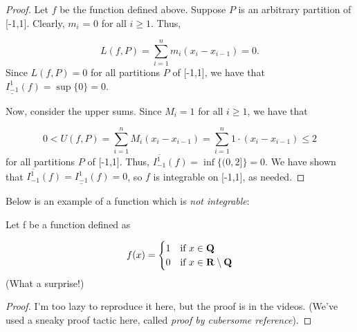 \documentclass{article}
\begin{document}
  \begin{proof}
    Let \(f\) be the function defined above. Suppose \(P\) is an arbitrary partition of [-1,1]. Clearly, \(m_i\) = 0 for all \(i \geq 1\). Thus,

    \[
      L(f,P) = \sum_{i = 1}^{n}{m_i(x_i - x_{i-1})} = 0.
    \]
    Since \(L(f,P) = 0\) for all partitions \(P\) of [-1,1], we have that \(\underline{I_{-1}^{1}}(f) = \sup\{0\} = 0\).

    Now, consider the upper sums. Since \(M_i = 1\) for all \(i \geq 1\), we have that

    \[
      0 < U(f,P) = \sum_{i = 1}^{n}{M_i(x_i - x_{i-1})} = \sum_{i = 1}^{n}{1 \cdot (x_i - x_{i-1})} \leq 2
    \]
    for all partitions \(P\) of [-1,1]. Thus, \(\overline{I_{-1}^{1}}(f) = \inf\{(0,2]\} = 0\).
    \vspace*{5pt}
    We have shown that \(\overline{I_{-1}^{1}}(f) = \underline{I_{-1}^{1}}(f) = 0\), so \(f\) is integrable on [-1,1], as needed.
  \end{proof}

  Below is an example of a function which is \emph{not integrable}:

  \begin{eg}
    Let f be a function defined as 

    \[
      f(x) = \begin{cases}
        1 & \text{if } x \in \mathbf{Q} \\
        0 & \text{if } x \in \mathbf{R} \setminus \mathbf{Q}
      \end{cases}
    \]
    (What a surprise!)

    \begin{proof}
      I'm too lazy to reproduce it here, but the proof is in the videos. (We've used a sneaky proof tactic here, called \emph{proof by cubersome reference}).
    \end{proof}
    
  \end{eg} 
\end{document}
